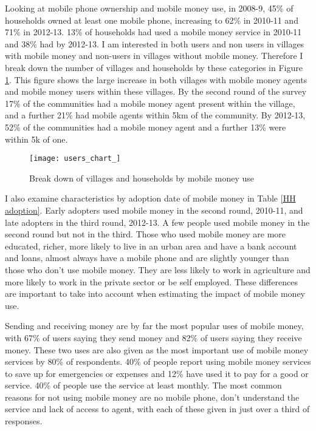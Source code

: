 Looking at mobile phone ownership and mobile money use,  in 2008-9, 45\% of households owned at least one mobile phone, increasing to 62\% in 2010-11 and 71\% in 2012-13. 13\% of households had used a mobile money service in 2010-11 and 38\% had by 2012-13. I am interested in both users and non users in villages with mobile money and non-users in villages without mobile money. Therefore I break down the number of villages and households by these categories in Figure \ref{fig:users chart}. This figure shows the large increase in both villages with mobile money agents and mobile money users within these villages. By the second round of the survey 17\% of the communities had a mobile money agent present within the village, and a further 21\% had mobile agents within 5km of the community. By 2012-13, 52\% of the communities had a mobile money agent and a further 13\% were within 5k of one.  
\begin{figure}
\centering
\texttt{[image: users\_chart\_]} 
\caption{Break down of villages and households by mobile money use} \label{fig:users chart}
\end{figure}

I also examine characteristics by adoption date of mobile money in Table \ref{HH adoption}. Early adopters used mobile money in the second round, 2010-11, and late adopters in the third round, 2012-13. A few people used mobile money in the second round but not in the third. Those who used mobile money are more educated, richer, more likely to live in an urban area and have a bank account and loans, almost always have a mobile phone and are slightly younger than those who don't use mobile money. They are less likely to work in agriculture and more likely to work in the private sector or be self employed. These differences are important to take into account when estimating the impact of mobile money use. 

Sending and receiving money are by far the most popular uses of mobile money, with 67\% of users saying they send money and 82\% of users saying they receive money. These two uses are also given as the most important use of mobile money services by 80\% of respondents. 40\% of people report using mobile money services to save up for emergencies or expenses and 12\% have used it to pay for a good or service. 40\% of people use the service at least monthly. The most common reasons for not using mobile money are no mobile phone, don't understand the service and lack of access to agent, with each of these given in just over a third of responses.  

